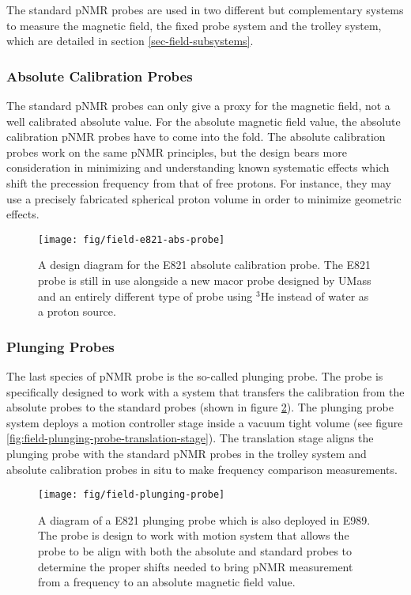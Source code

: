 The standard pNMR probes are used in two different but complementary systems to measure the magnetic field, the fixed probe system and the trolley system, which are detailed in section \ref{sec-field-subsystems}.

\subsubsection{Absolute Calibration Probes}

The standard pNMR probes can only give a proxy for the magnetic field, not a well calibrated absolute value.  For the absolute magnetic field value, the absolute calibration pNMR probes have to come into the fold.  The absolute calibration probes work on the same pNMR principles, but the design bears more consideration in minimizing and understanding known systematic effects which shift the precession frequency from that of free protons.  For instance, they may use a precisely fabricated spherical proton volume in order to minimize geometric effects.

\begin{figure}
\label{fig:field-e821-abs-probe}
\centering
\texttt{[image: fig/field-e821-abs-probe]}
\caption{A design diagram for the E821 absolute calibration probe.  The E821 probe is still in use alongside a new macor probe designed by UMass and an entirely different type of probe using $\mathrm{^3He}$ instead of water as a proton source.}
\end{figure}

\subsubsection{Plunging Probes}

The last species of pNMR probe is the so-called plunging probe. The probe is specifically designed to work with a system that transfers the calibration from the absolute probes to the standard probes (shown in figure \ref{fig:field-plunging-probe}).  The plunging probe system deploys a motion controller stage inside a vacuum tight volume (see figure \ref{fig:field-plunging-probe-translation-stage}).  The translation stage aligns the plunging probe with the standard pNMR probes in the trolley system and absolute calibration probes in situ to make frequency comparison measurements.

\begin{figure}
\label{fig:field-plunging-probe}
\centering
\texttt{[image: fig/field-plunging-probe]}
\caption{A diagram of a E821 plunging probe which is also deployed in E989.  The probe is design to work with motion system that allows the probe to be align with both the absolute and standard probes to determine the proper shifts needed to bring pNMR measurement from a frequency to an absolute magnetic field value.}
\end{figure}


